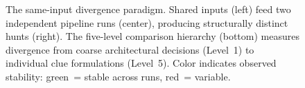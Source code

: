\begin{figure}[t]
\begin{tikzpicture}
\end{tikzpicture}

\caption{The same-input divergence paradigm. Shared inputs (left) feed two independent
pipeline runs (center), producing structurally distinct hunts (right). The five-level
comparison hierarchy (bottom) measures divergence from coarse architectural decisions
(Level~1) to individual clue formulations (Level~5). Color indicates observed stability:
green~= stable across runs, red~= variable.}
\label{fig:paradigm}
\end{figure}
